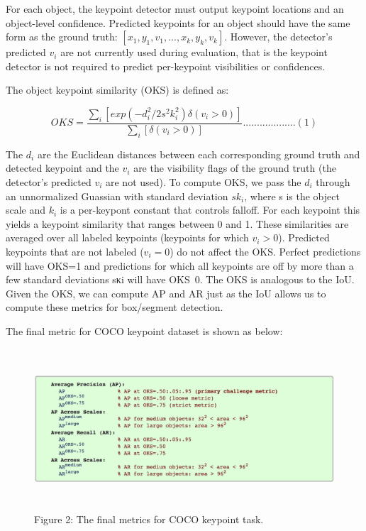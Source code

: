 For each object, the keypoint detector must output keypoint locations and an object-level confidence.
Predicted keypoints for an object should have the same form as the ground truth: $[x_{1},y_{1},v_{1},...,x_{k},y_{k},v_{k}]$.
However, the detector's predicted $v_{i}$ are not currently used during evaluation, that is the keypoint detector is not required to predict per-keypoint visibilities or confidences.

The object keypoint similarity (OKS) is defined as:

\[ OKS =  \frac{\sum_{i}[exp(-d_{i}^{2} / 2s^{2}k_{i}^{2}) \delta (v_{i}>0)]}{\sum_{i} [\delta(v_{i}>0)]} ...................(1) \]

The $d_{i}$ are the Euclidean distances between each corresponding ground truth and detected keypoint and the $v_{i}$ are the visibility flags of the ground truth (the detector's predicted $v_{i}$ are not used).
To compute OKS, we pass the $d_{i}$ through an unnormalized Guassian with standard deviation $sk_{i}$, where s is the object scale and $k_{i}$ is a per-keypont constant that controls falloff.
For each keypoint this yields a keypoint similarity that ranges between 0 and 1.
These similarities are averaged over all labeled keypoints (keypoints for which $v_{i}>0$).
Predicted keypoints that are not labeled ($v_{i}=0$) do not affect the OKS.
Perfect predictions will have OKS=1 and predictions for which all keypoints are off by more than a few standard deviations sκi will have OKS~0.
The OKS is analogous to the IoU.
Given the OKS, we can compute AP and AR just as the IoU allows us to compute these metrics for box/segment detection.

The final metric for COCO keypoint dataset is shown as below:

\captionsetup[figure]{labelformat=empty}
\begin{figure}[htbp]
  \centering
  \includegraphics[width=16cm,height=6cm]{source/metric.png}
  \caption{Figure 2: The final metrics for COCO keypoint task. }
\end{figure}




